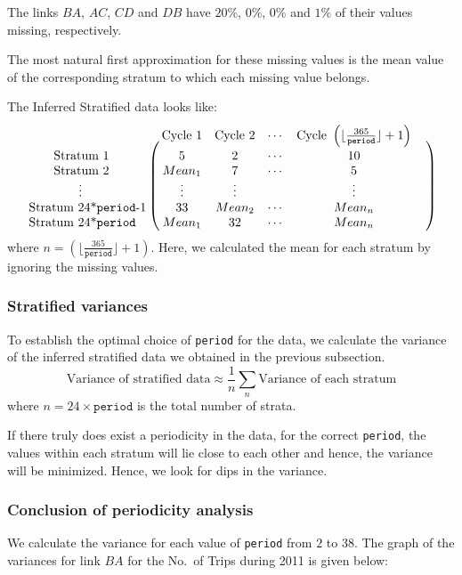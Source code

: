 \documentclass[10pt,a4paper]{amsart}
\begin{document}
The links \(BA\), \(AC\), \(CD\) and \(DB\) have \(20\%\), \(0\%\), \(0\%\)
and \(1\%\) of their values missing, respectively.

The most natural first approximation for these missing values is the mean
value of the corresponding stratum to which each missing value belongs.

The Inferred Stratified data looks like:
\[\bordermatrix{
	~ & \text{Cycle 1} & \text{Cycle 2} & \cdots &\text{Cycle }\left(
		\lfloor\frac{365}{\mathtt{period}}\rfloor+1\right)&\cr
	\qquad\text{Stratum 1} & 5 & 2 & \cdots & 10 \cr
	\qquad\text{Stratum 2} & Mean_1 & 7 & \cdots & 5 \cr
	\qquad\qquad\vdots & \vdots & \vdots & ~ & \vdots \cr
	\text{Stratum 24*\texttt{period}-1} & 33 & Mean_2 & \cdots & Mean_n \cr
	\text{Stratum 24*\texttt{period}} & Mean_1 & 32 & \cdots & Mean_n \cr	}\]
where \(n=\left(\lfloor\frac{365}{\mathtt{period}}\rfloor+1\right)\). Here, we
calculated the mean for each stratum by ignoring the missing values.

\subsubsection{Stratified variances}
To establish the optimal choice of \texttt{period} for the data, we calculate
the variance of the inferred stratified data we obtained in the previous
subsection.
	\[\text{Variance of stratified data} \approx \frac{1}{n}
		\sum_n{\text{Variance of each stratum}}\]
where \(n=24\times\mathtt{period}\) is the total number of strata.

If there truly does exist a periodicity in the data, for the correct
\texttt{period}, the values within each stratum will lie close to each other
and hence, the variance will be minimized. Hence, we look for dips in the
variance.

\subsubsection{Conclusion of periodicity analysis}
We calculate the variance for each value of \texttt{period} from \(2\) to
\(38\). The graph of the variances for link \(BA\) for the No.\ of Trips
during 2011 is given below:
\end{document}
